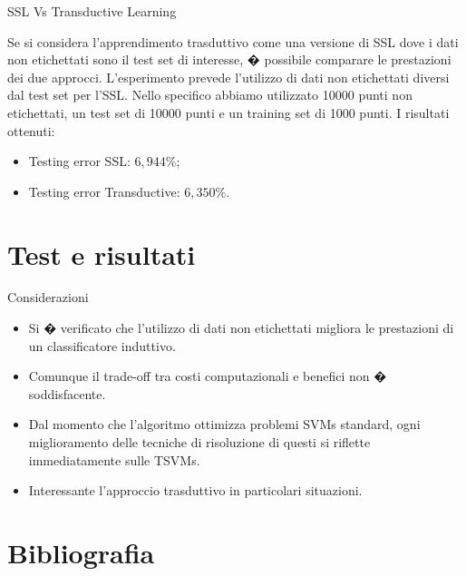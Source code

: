 \documentclass[mathserif]{beamer}
\begin{document}
\begin{frame}{SSL Vs Transductive Learning}
\begin{block}{}
Se si considera l'apprendimento trasduttivo come una versione di SSL dove i dati non etichettati sono il test set di interesse, � possibile comparare le prestazioni dei due approcci. L'esperimento prevede l'utilizzo di dati non etichettati diversi dal test set per l'SSL. Nello specifico abbiamo utilizzato 10000 punti non etichettati, un test set di 10000 punti e un training set di 1000 punti. I risultati ottenuti:
\begin{itemize}
	\item<1-> Testing error SSL: \alert{$6,944 \%$};
	\item<1-> Testing error Transductive: \alert{$6,350 \%$}.
\end{itemize}
\end{block}
\end{frame}

\section{Test e risultati}


\begin{frame}{Considerazioni}
\begin{block}{}
\begin{itemize}
	\item<1-> Si � verificato che l'utilizzo di dati non etichettati migliora le prestazioni di un classificatore induttivo.
	\item<1-> Comunque il trade-off tra costi computazionali e benefici non � soddisfacente.
	\item<1-> Dal momento che l'algoritmo ottimizza problemi SVMs standard, ogni miglioramento delle tecniche di risoluzione di questi si riflette immediatamente sulle TSVMs.  
	\item<1-> Interessante l'approccio trasduttivo in particolari situazioni.
\end{itemize}
\end{block}
\end{frame}




\section{Bibliografia}
\end{document}
